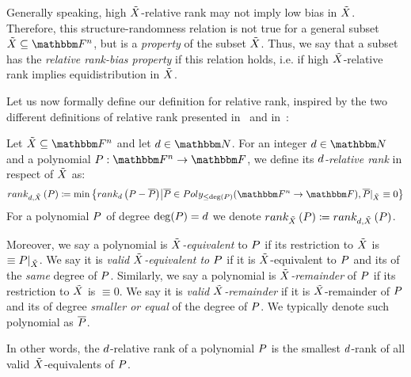 Generally speaking, high ${\tilde{X}}$-relative rank may not imply low bias in ${\tilde{X}}$.
Therefore, this structure-randomness relation is not true for a general subset $\variety \subseteq \field$,
but is a \emph{property} of the subset ${\tilde{X}}$.
Thus, we say that a subset has the \emph{relative rank-bias property} if this relation holds,
i.e. if high ${\tilde{X}}$-relative rank implies equidistribution in ${\tilde{X}}$.

Let us now formally define our definition for relative rank, inspired by the two different definitions of relative rank presented in~\cite[Definition 1.6]{lampert2021relative}
and in~\cite[Definition 1.3]{gowers2022equidistributionhighrankpolynomialsvariables}:
\begin{definition}\label{def:relative-rank-of-polynomial}
    Let $\variety \subseteq \field$ and let $\degree \in \naturalnumbersset$.
    For an integer $\degree \in \naturalnumbersset$ and a polynomial $\funcdef{\genpoly}{\field}{\basefield}$, we define its \emph{$d$-relative rank} in respect of ${\tilde{X}}$ as:
    \[
        \drelrank{\degree}{\variety}{\genpoly} \definedas \min \set{\drank{\degree}{\genpoly - \relativeremainder{\genpoly}} \suchthat
        \relativeremainder{\genpoly} \in \allpolyset{\leq \deg(\genpoly)}{\field}{\basefield}, \restrictfunc{\relativeremainder{\genpoly}}{\variety} \equiv 0}
    \]
    For a polynomial $\genpoly$ of degree $\deg(\genpoly) = \degree$ we denote $\relrank{\variety}{\genpoly} \definedas \drelrank{\degree}{\variety}{\genpoly}$.
\end{definition}
\begin{definition}
    Moreover, we say a polynomial is \emph{${\tilde{X}}$-equivalent} to $\genpoly$ if its restriction to ${\tilde{X}}$ is $\equiv \restrictfunc{\genpoly}{\variety}$.
    We say it is \emph{valid ${\tilde{X}}$-equivalent to $\genpoly$} if it is ${\tilde{X}}$-equivalent to $\genpoly$ and its of the \emph{same} degree of $\genpoly$.
    \newline
    Similarly, we say a polynomial is \emph{${\tilde{X}}$-remainder} of $\genpoly$ if its restriction to ${\tilde{X}}$ is \emph{$\equiv 0$}.
    We say it is \emph{valid ${\tilde{X}}$-remainder} if it is ${\tilde{X}}$-remainder of $\genpoly$ and its of degree \emph{smaller or equal} of the degree of $\genpoly$.
    \newline
    We typically denote such polynomial as $\relativeremainder{\genpoly}$.
\end{definition}
In other words, the $d$-relative rank of a polynomial $\genpoly$ is the smallest $d$-rank of all valid ${\tilde{X}}$-equivalents of $\genpoly$.

